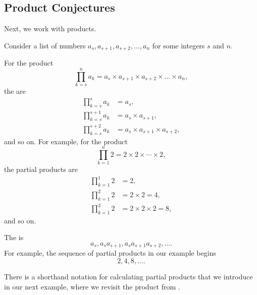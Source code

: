 \newcommand{\subprodconj}{Product Conjectures}
\subsection{\subprodconj}
\label{sub_prod_conj}

Next, we work with products.

\begin{defn}
\label{defn_partial_prod}
   Consider a list of numbers  $a_s, a_{s+1}, a_{s+2}, \ldots, a_n$ for some integers $s$ and $n$. 
        \begin{apart}
            \item For the product  
                $$\prod_{k=s}^n a_k =a_s \times a_{s+1} \times a_{s+2} \times \ldots \times a_n,$$
            the  are
                \begin{align*}
                    \prod_{k=s}^s a_k &=a_s,\\
                    \prod_{k=s}^{s+1} a_k &=a_s \times a_{s+1}, \\
                    \prod_{k=s}^{s+2} a_k &=a_s \times a_{s+1} \times a_{s+2},
                \end{align*}
            and so on.  For example, for the product $$\prod_{k=1}^n 2 = 2 \times 2 \times \cdots \times 2,$$ 
            the partial products are
                \begin{align*}
                    \prod_{k=1}^1 2 &=2, \\
                    \prod_{k=1}^2 2 &=2 \times 2=4,\\
                    \prod_{k=1}^3 2 &=2 \times 2 \times 2=8,
                \end{align*}
            and so on.
            \item The  is 
                $$a_s, a_sa_{s+1},a_sa_{s+1}a_{s+2}, \ldots.$$
            For example, the sequence of partial products in our example begins $$2, 4, 8, \ldots.$$
        \end{apart}           
\end{defn}

There is a shorthand notation for calculating partial products that we introduce in our next example, where we revisit the product from . 

